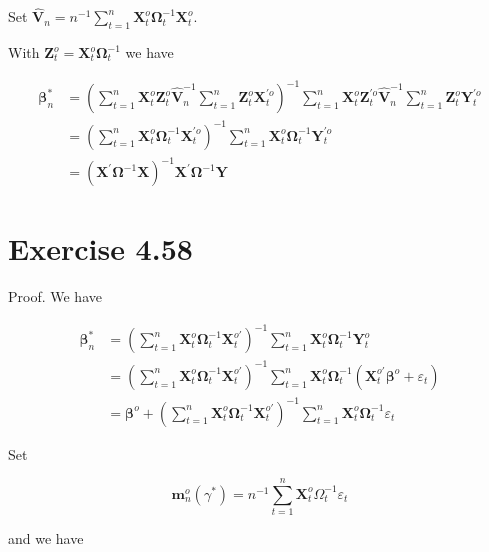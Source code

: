\documentclass[10pt]{article}
\begin{document}
Set $\hat{\mathbf{V}}_{n}=n^{-1} \sum_{t=1}^{n} \mathbf{X}_{t}^{o} \boldsymbol{\Omega}_{t}^{-1} \mathbf{X}_{t}^{o}$.

With $\mathbf{Z}_{t}^{o}=\mathbf{X}_{t}^{o} \boldsymbol{\Omega}_{t}^{-1}$ we have

$$
\begin{aligned}
\boldsymbol{\beta}_{n}^{*} & =\left(\sum_{t=1}^{n} \mathbf{X}_{t}^{o} \mathbf{Z}_{t}^{o} \hat{\mathbf{V}}_{n}^{-1} \sum_{t=1}^{n} \mathbf{Z}_{t}^{o} \mathbf{X}_{t}^{\prime o}\right)^{-1} \sum_{t=1}^{n} \mathbf{X}_{t}^{o} \mathbf{Z}_{t}^{\prime o} \hat{\mathbf{V}}_{n}^{-1} \sum_{t=1}^{n} \mathbf{Z}_{t}^{o} \mathbf{Y}_{t}^{\prime o} \\
& =\left(\sum_{t=1}^{n} \mathbf{X}_{t}^{o} \boldsymbol{\Omega}_{t}^{-1} \mathbf{X}_{t}^{\prime o}\right)^{-1} \sum_{t=1}^{n} \mathbf{X}_{t}^{o} \boldsymbol{\Omega}_{t}^{-1} \mathbf{Y}_{t}^{\prime o} \\
& =\left(\mathbf{X}^{\prime} \boldsymbol{\Omega}^{-1} \mathbf{X}\right)^{-1} \mathbf{X}^{\prime} \boldsymbol{\Omega}^{-1} \mathbf{Y}
\end{aligned}
$$

\section*{Exercise 4.58}
Proof. We have

$$
\begin{aligned}
\boldsymbol{\beta}_{n}^{*} & =\left(\sum_{t=1}^{n} \mathbf{X}_{t}^{o} \boldsymbol{\Omega}_{t}^{-1} \mathbf{X}_{t}^{o \prime}\right)^{-1} \sum_{t=1}^{n} \mathbf{X}_{t}^{o} \boldsymbol{\Omega}_{t}^{-1} \mathbf{Y}_{t}^{o} \\
& =\left(\sum_{t=1}^{n} \mathbf{X}_{t}^{o} \boldsymbol{\Omega}_{t}^{-1} \mathbf{X}_{t}^{o \prime}\right)^{-1} \sum_{t=1}^{n} \mathbf{X}_{t}^{o} \boldsymbol{\Omega}_{t}^{-1}\left(\mathbf{X}_{t}^{o \prime} \boldsymbol{\beta}^{o}+\varepsilon_{t}\right) \\
& =\boldsymbol{\beta}^{o}+\left(\sum_{t=1}^{n} \mathbf{X}_{t}^{o} \boldsymbol{\Omega}_{t}^{-1} \mathbf{X}_{t}^{o \prime}\right)^{-1} \sum_{t=1}^{n} \mathbf{X}_{t}^{o} \boldsymbol{\Omega}_{t}^{-1} \varepsilon_{t}
\end{aligned}
$$

Set

$$
\mathbf{m}_{n}^{o}\left(\gamma^{*}\right)=n^{-1} \sum_{t=1}^{n} \mathbf{X}_{t}^{o} \Omega_{t}^{-1} \varepsilon_{t}
$$

and we have
\end{document}
